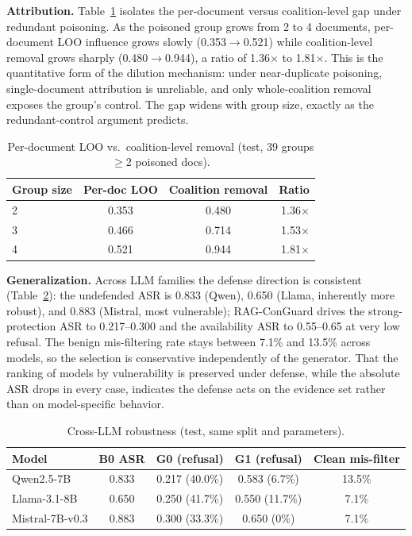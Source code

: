 \documentclass[sigconf]{acmart}
\begin{document}
\textbf{Attribution.} Table~\ref{tab:attr} isolates the per-document versus coalition-level gap under redundant poisoning. As the poisoned group grows from 2 to 4 documents, per-document LOO influence grows slowly (0.353$\rightarrow$0.521) while coalition-level removal grows sharply (0.480$\rightarrow$0.944), a ratio of 1.36$\times$ to 1.81$\times$. This is the quantitative form of the dilution mechanism: under near-duplicate poisoning, single-document attribution is unreliable, and only whole-coalition removal exposes the group's control. The gap widens with group size, exactly as the redundant-control argument predicts.

\begin{table}[t]
  \caption{Per-document LOO vs.\ coalition-level removal (test, 39 groups $\geq$2 poisoned docs).}
  \label{tab:attr}
  \begin{tabular}{lccr}
    \toprule
    Group size & Per-doc LOO & Coalition removal & Ratio \\
    \midrule
    2 & 0.353 & 0.480 & 1.36$\times$ \\
    3 & 0.466 & 0.714 & 1.53$\times$ \\
    4 & 0.521 & 0.944 & 1.81$\times$ \\
    \bottomrule
  \end{tabular}
\end{table}

\textbf{Generalization.} Across LLM families the defense direction is consistent (Table~\ref{tab:crossllm}): the undefended ASR is 0.833 (Qwen), 0.650 (Llama, inherently more robust), and 0.883 (Mistral, most vulnerable); RAG-ConGuard drives the strong-protection ASR to 0.217--0.300 and the availability ASR to 0.55--0.65 at very low refusal. The benign mis-filtering rate stays between 7.1\% and 13.5\% across models, so the selection is conservative independently of the generator. That the ranking of models by vulnerability is preserved under defense, while the absolute ASR drops in every case, indicates the defense acts on the evidence set rather than on model-specific behavior.

\begin{table}[t]
  \caption{Cross-LLM robustness (test, same split and parameters).}
  \label{tab:crossllm}
  \begin{tabular}{lcccc}
    \toprule
    Model & B0 ASR & G0 (refusal) & G1 (refusal) & Clean mis-filter \\
    \midrule
    Qwen2.5-7B & 0.833 & 0.217 (40.0\%) & 0.583 (6.7\%) & 13.5\% \\
    Llama-3.1-8B & 0.650 & 0.250 (41.7\%) & 0.550 (11.7\%) & 7.1\% \\
    Mistral-7B-v0.3 & 0.883 & 0.300 (33.3\%) & 0.650 (0\%) & 7.1\% \\
    \bottomrule
  \end{tabular}
\end{table}
\end{document}

